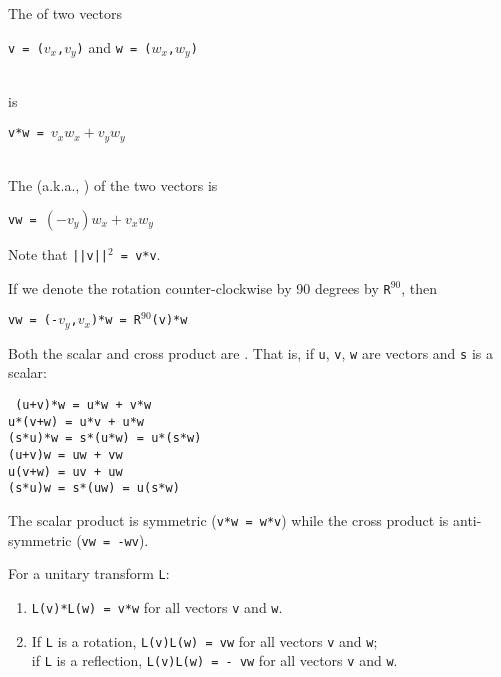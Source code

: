 \documentclass[12pt]{article}
\begin{document}
\begin{definition}
The  of two vectors \\
\centerline{{\tt v = ($v_x$,$v_y$)} and {\tt w = ($w_x$,$w_y$)}} \\
is \\
\centerline{\tt v*w = $v_x w_x + v_y w_y$} \\
The  (a.k.a., ) of the two vectors is \\
\centerline{\tt v\WH w = $(-v_y)w_x + v_x w_y$}
\end{definition}

Note that {\tt ||v||$^2$ = v*v}.

If we denote the rotation counter-clockwise by 90 degrees by {\tt R}$^{90}$,
then \\
\centerline{\tt v\WH w = (-$v_y$,$v_x$)*w = R$^{90}$(v)*w}

Both the scalar and cross product are .  That is,
if {\tt u}, {\tt v}, {\tt w} are vectors and {\tt s} is a scalar:
\begin{center}
\tt
(u+v)*w = u*w + v*w \\
u*(v+w) = u*v + u*w \\
(s*u)*w = s*(u*w) = u*(s*w) \\
(u+v)\WH w = u\WH w + v\WH w \\
u\WH (v+w) = u\WH v + u\WH w \\
(s*u)\WH w = s*(u\WH w) = u\WH (s*w)
\end{center}

The scalar product is symmetric ({\tt v*w = w*v})
while the cross product is anti-symmetric ({\tt v\WH w = -w\WH v}).

\begin{lemma}
For a unitary transform {\tt L}:
\begin{enumerate}
\item {\tt L(v)*L(w) = v*w} for all vectors {\tt v} and {\tt w}.
\item If {\tt L} is a rotation,
         {\tt L(v)\WH L(w) = v\WH w} for all vectors {\tt v} and {\tt w}; \\
      if {\tt L} is a reflection,
         {\tt L(v)\WH L(w) = - v\WH w} for all vectors {\tt v} and {\tt w}.
\end{enumerate}
\end{lemma}
\end{document}
